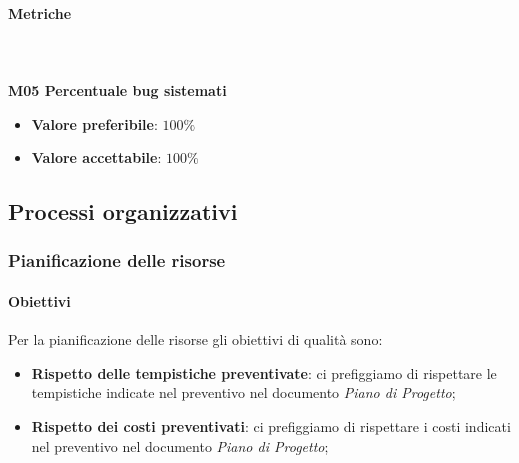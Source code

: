 			\paragraph{Metriche} \mbox{} \\ \\
			\textbf{M05 Percentuale bug sistemati}
			\begin{itemize}
				\item \textbf{Valore preferibile}: $100\%$
				\item \textbf{Valore accettabile}: $100\%$  
			\end{itemize}

	\subsection{Processi organizzativi}
		\subsubsection{Pianificazione delle risorse}
			\paragraph{Obiettivi}
			Per la pianificazione delle risorse gli obiettivi di qualità sono:
			\begin{itemize}
				\item \textbf{Rispetto delle tempistiche preventivate}: ci prefiggiamo di rispettare le tempistiche indicate nel preventivo nel documento \textit{Piano di Progetto};
				\item \textbf{Rispetto dei costi preventivati}: ci prefiggiamo di rispettare i costi indicati nel preventivo nel documento \textit{Piano di Progetto};
			\end{itemize}	
